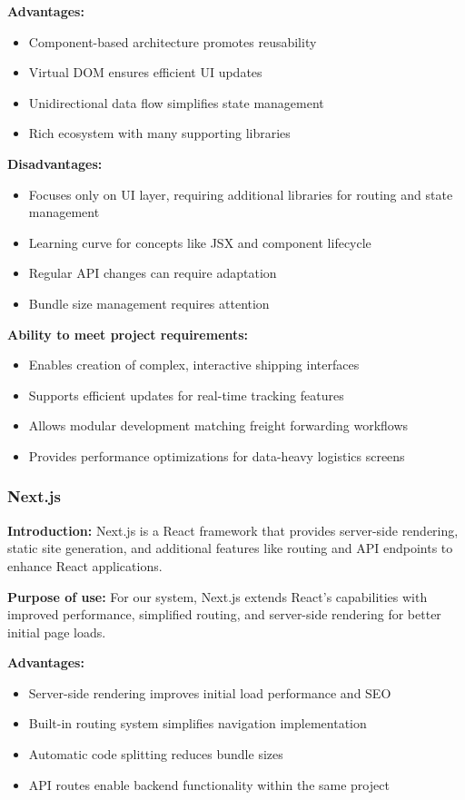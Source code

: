 \textbf{Advantages:}
\begin{itemize}
    \item Component-based architecture promotes reusability
    \item Virtual DOM ensures efficient UI updates
    \item Unidirectional data flow simplifies state management
    \item Rich ecosystem with many supporting libraries
\end{itemize}

\textbf{Disadvantages:}
\begin{itemize}
    \item Focuses only on UI layer, requiring additional libraries for routing and state management
    \item Learning curve for concepts like JSX and component lifecycle
    \item Regular API changes can require adaptation
    \item Bundle size management requires attention
\end{itemize}

\textbf{Ability to meet project requirements:}
\begin{itemize}
    \item Enables creation of complex, interactive shipping interfaces
    \item Supports efficient updates for real-time tracking features
    \item Allows modular development matching freight forwarding workflows
    \item Provides performance optimizations for data-heavy logistics screens
\end{itemize}

\subsubsection{Next.js}
\textbf{Introduction:} Next.js \cite{nextjs} is a React framework that provides server-side rendering, static site generation, and additional features like routing and API endpoints to enhance React applications.

\textbf{Purpose of use:} For our system, Next.js extends React's capabilities with improved performance, simplified routing, and server-side rendering for better initial page loads.

\textbf{Advantages:}
\begin{itemize}
    \item Server-side rendering improves initial load performance and SEO
    \item Built-in routing system simplifies navigation implementation
    \item Automatic code splitting reduces bundle sizes
    \item API routes enable backend functionality within the same project
\end{itemize}

